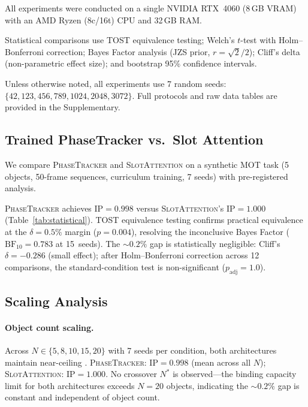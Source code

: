 \documentclass[11pt]{article}
\providecommand{\pt}{\textnormal{\textsc{PhaseTracker}}\xspace}
\providecommand{\sa}{\textnormal{\textsc{SlotAttention}}\xspace}
\providecommand{\ip}{\text{IP}}
\begin{document}
All experiments were conducted on a single NVIDIA RTX~4060 (8\,GB VRAM)
with an AMD Ryzen (8c/16t) CPU and 32\,GB RAM.

Statistical comparisons use TOST equivalence testing; Welch's $t$-test
with Holm--Bonferroni correction; Bayes Factor analysis (JZS prior,
$r = \sqrt{2}/2$); Cliff's delta (non-parametric effect size); and
bootstrap 95\% confidence intervals.

Unless otherwise noted, all experiments use 7 random seeds:
$\{42, 123, 456, 789, 1024,\allowbreak 2048,\allowbreak 3072\}$.
Full protocols and raw data tables are provided in the Supplementary.

\subsection{Trained PhaseTracker vs.\ Slot Attention}
\label{sec:trained}

We compare \pt and \sa on a synthetic MOT task (5 objects, 50-frame
sequences, curriculum training, 7 seeds) with pre-registered analysis.



\pt achieves $\ip = 0.998$ versus \sa's $\ip = 1.000$
(Table~\ref{tab:statistical}).  TOST equivalence testing confirms
practical equivalence at the $\delta = 0.5\%$ margin ($p = 0.004$),
resolving the inconclusive Bayes Factor ($\text{BF}_{10} = 0.783$
at 15~seeds).  The ${\sim}0.2\%$ gap is statistically negligible:
Cliff's $\delta = -0.286$ (small effect); after Holm--Bonferroni
correction across 12 comparisons, the standard-condition test
is non-significant ($p_{\text{adj}} = 1.0$).

\subsection{Scaling Analysis}
\label{sec:scaling}

\paragraph{Object count scaling.}
Across $N \in \{5, 8, 10, 15, 20\}$ with 7 seeds per condition,
both architectures maintain near-ceiling \ip.  \pt: $\ip = 0.998$
(mean across all $N$); \sa: $\ip = 1.000$.  No crossover $N^*$ is
observed---the binding capacity limit for both architectures exceeds
$N = 20$ objects, indicating the ${\sim}0.2\%$ gap is constant and
independent of object count.
\end{document}
